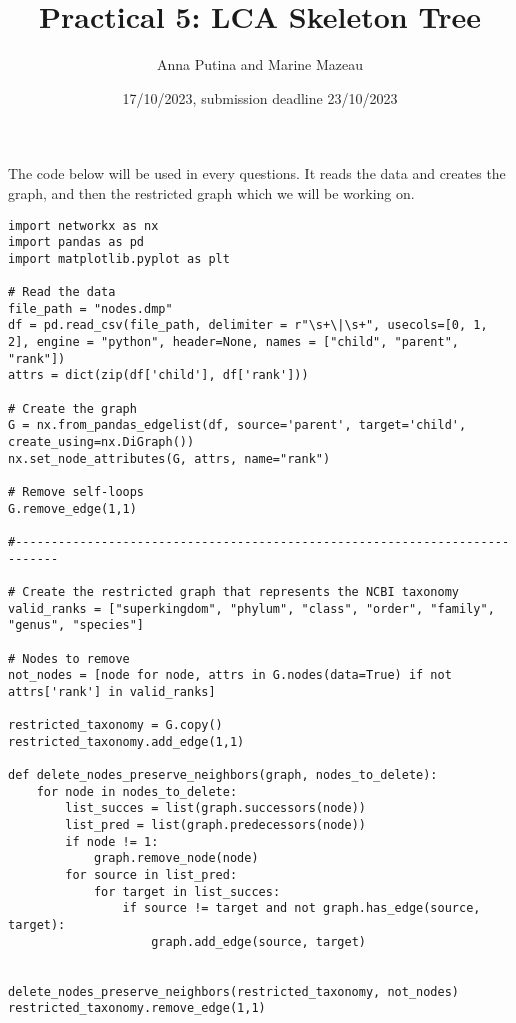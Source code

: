 \documentclass[12 pt,a4paper]{article}
\title{Practical 5:  LCA Skeleton Tree}
\author{Anna Putina and Marine Mazeau}
\date{17/10/2023, submission deadline 23/10/2023}
\begin{document}
\maketitle
The code below will be used in every questions. It reads the data and creates the graph, and then the restricted graph which we will be working on.
\begin{verbatim}
import networkx as nx
import pandas as pd
import matplotlib.pyplot as plt

# Read the data
file_path = "nodes.dmp"
df = pd.read_csv(file_path, delimiter = r"\s+\|\s+", usecols=[0, 1, 2], engine = "python", header=None, names = ["child", "parent", "rank"]) 
attrs = dict(zip(df['child'], df['rank']))

# Create the graph
G = nx.from_pandas_edgelist(df, source='parent', target='child', create_using=nx.DiGraph())
nx.set_node_attributes(G, attrs, name="rank")

# Remove self-loops
G.remove_edge(1,1)

#----------------------------------------------------------------------------

# Create the restricted graph that represents the NCBI taxonomy
valid_ranks = ["superkingdom", "phylum", "class", "order", "family", "genus", "species"]

# Nodes to remove
not_nodes = [node for node, attrs in G.nodes(data=True) if not attrs['rank'] in valid_ranks]

restricted_taxonomy = G.copy()
restricted_taxonomy.add_edge(1,1)

def delete_nodes_preserve_neighbors(graph, nodes_to_delete):
    for node in nodes_to_delete:
        list_succes = list(graph.successors(node)) 
        list_pred = list(graph.predecessors(node))
        if node != 1:
            graph.remove_node(node)
        for source in list_pred:
            for target in list_succes:
                if source != target and not graph.has_edge(source, target):
                    graph.add_edge(source, target)


delete_nodes_preserve_neighbors(restricted_taxonomy, not_nodes)
restricted_taxonomy.remove_edge(1,1)
\end{verbatim}
\newpage
\end{document}
